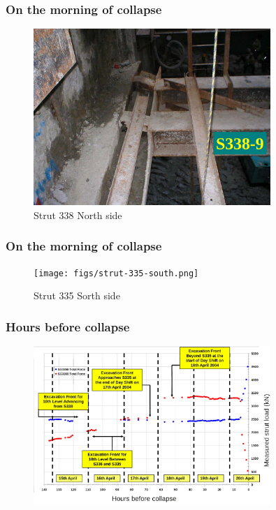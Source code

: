 \documentclass[handout]{beamer}
\begin{document}
\begin{frame}
\frametitle{On the morning of collapse}
\begin{figure}[ht]
	\centering
	\includegraphics[width=0.8\textwidth]{figs/strut-338.png}
	\caption*{Strut 338 North side}
\end{figure}
\end{frame}

\begin{frame}
\frametitle{On the morning of collapse}
\begin{figure}[ht]
	\centering
	\texttt{[image: figs/strut-335-south.png]}
	\caption*{Strut 335 Sorth side}
\end{figure}
\end{frame}

\begin{frame}
\frametitle{Hours before collapse}
\begin{figure}[ht]
	\centering
	\includegraphics[width=0.8\textwidth]{figs/strut-load-before-collapse.png}
\end{figure}
\end{frame}
\end{document}
